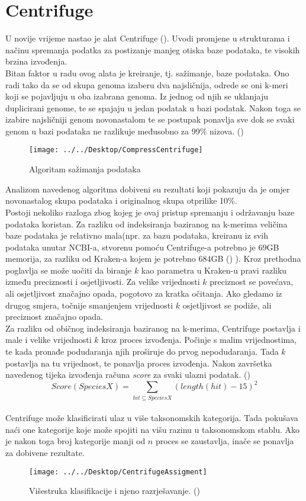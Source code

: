\documentclass[times, utf8, seminar]{fer}
\begin{document}
\section{Centrifuge}
U novije vrijeme nastao je alat Centrifuge (\cite{Centrifuge}). Uvodi promjene u strukturama i načinu spremanja podatka za postizanje manjeg otiska baze podataka, te visokih brzina izvođenja.
\\Bitan faktor u radu ovog alata je kreiranje, tj. sažimanje, baze podataka. Ono radi tako da se od skupa genoma izaberu dva najsličnija, odrede se oni k-meri koji se pojavljuju u oba izabrana genoma. Iz jednog od njih se uklanjaju duplicirani genome, te se spajaju u jedan podatak u bazi podatak. Nakon toga se izabire najsličniji genom novonastalom te se postupak ponavlja sve dok se svaki genom u bazi podataka ne razlikuje međusobno za 99\% nizova. (\cite{Centrifuge})
\begin{figure}
	\centering
	\texttt{[image: ../../Desktop/CompressCentrifuge]}
	\caption{Algoritam sažimanja podataka}
	\label{fig:compresscentrifuge}
\end{figure}
Analizom navedenog algoritma dobiveni su rezultati koji pokazuju da je omjer novonastalog skupa podataka i originalnog skupa otprilike 10\%.
\\Postoji nekoliko razloga zbog kojeg je ovaj pristup spremanju i održavanju baze podataka koristan. Za razliku od indeksiranja baziranog na k-merima veličina baze podataka je relativno mala(npr. za bazu podataka, kreiranu iz svih podataka unutar NCBI-a, stvorenu pomoću Centrifuge-a potrebno je 69GB memorija, za razliku od Kraken-a kojem je potrebno 684GB (\cite{Centrifuge}) ). Kroz prethodna poglavlja se može uočiti da biranje ${k}$ kao parametra u Kraken-u pravi razliku između preciznosti i osjetljivosti. Za velike vrijednosti $k$ preciznost se povećava, ali osjetljivost značajno opada, pogotovo za kratka očitanja. Ako gledamo iz drugog smjera, točnije smanjenjem vrijednosti $k$ osjetljivost se podiže, ali preciznost značajno opada.
\\Za razliku od običnog indeksiranja baziranog na k-merima, Centrifuge postavlja i male i velike vrijednosti $k$ kroz proces izvođenja. Počinje s malim vrijednostima, te kada pronađe podudaranja njih proširuje do prvog nepodudaranja. Tada $k$ postavlja na tu vrijednost, te ponavlja proces izvođenja. Nakon završetka navedenog tijeka izvođenja računa \textit{score} za svaki ulazni podatak. (\cite{Centrifuge})
$$Score(Species X) = \sum_{hit\subseteq Species X} (length(hit) - 15)^2$$
\\Centrifuge može klasificirati ulaz u više taksonomskih kategorija. Tada pokušava naći one kategorije koje može spojiti na višu razinu u taksonomskom stablu. Ako je nakon toga broj kategorije manji od $n$ proces se zaustavlja, inače se ponavlja za dobivene rezultate.
\begin{figure}
	\centering
	\texttt{[image: ../../Desktop/CentrifugeAssigment]}
	\caption{Višestruka klasifikacije i njeno razrješavanje. (\cite{Centrifuge})}
	\label{fig:centrifugeassigment}
\end{figure}
\end{document}
